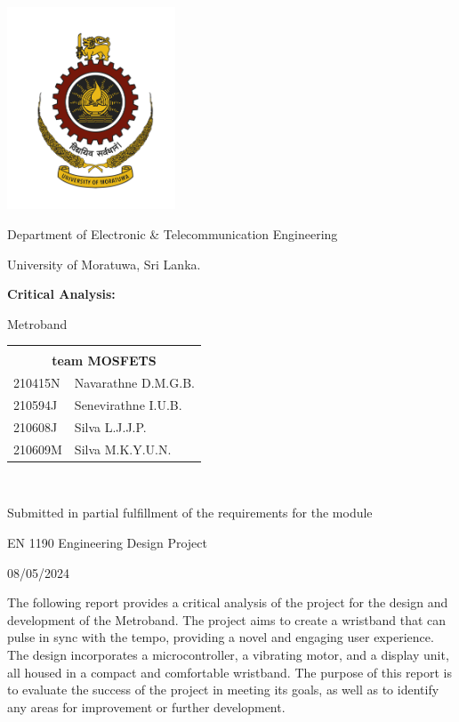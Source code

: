 \documentclass{article}
\begin{document}
	
	\begin{titlepage}
		
		\centering
		\vspace*{0.5cm}
		\includegraphics[width=5cm]{logo.png} %
		\par\vspace{0.02cm}
		Department of Electronic \& Telecommunication Engineering
  
            University of Moratuwa, Sri Lanka.
		\par\vspace{4cm}
		{\LARGE\bfseries Critical Analysis:}\\{\LARGE Metroband\par}
		\vspace{4cm}
		\begin{tabular}{l l}
			& \\
            \multicolumn{2}{c}{\textbf{team MOSFETS}}\\
            210415N	&	Navarathne D.M.G.B.\\
            210594J &	Senevirathne I.U.B.\\
            210608J &	Silva L.J.J.P.\\
            210609M	&	Silva M.K.Y.U.N. \\
		\end{tabular}\\
		\vspace{1.3cm}
            {Submitted in partial fulfillment of the requirements for the module\par}
		{EN 1190 Engineering Design Project\par}
	
		\vspace{0.5cm}
		{\large 08/05/2024\par}
		\vfill
	\end{titlepage}

        \newpage
        The following report provides a critical analysis of the project for the design and development of the Metroband. The project aims to create a wristband that can pulse in sync with the tempo, providing a novel and engaging user experience. The design incorporates a microcontroller, a vibrating motor, and a display unit, all housed in a compact and comfortable wristband. The purpose of this report is to evaluate the success of the project in meeting its goals, as well as to identify any areas for improvement or further development.\\
\end{document}
